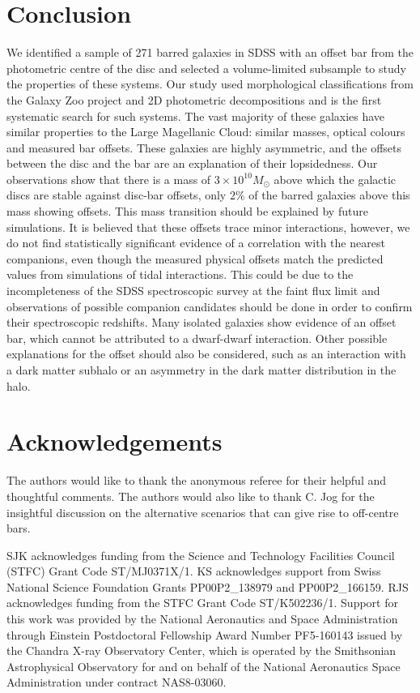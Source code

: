 \documentclass[a4paper,fleqn,usenatbib,useAMS]{mnras}
\begin{document}
\section{Conclusion}

We identified a sample of 271 barred galaxies in SDSS with an offset bar from the photometric centre of the disc and selected a volume-limited subsample to study the properties of these systems. Our study used morphological classifications from the Galaxy Zoo project and 2D photometric decompositions and is the first systematic search for such systems. The vast majority of these galaxies have similar properties to the Large Magellanic Cloud: similar masses, optical colours and measured bar offsets. These galaxies are highly asymmetric, and the offsets between the disc and the bar are an explanation of their lopsidedness. Our observations show that there is a mass of $3 \times10^{10} M_{\odot}$ above which the galactic discs are stable against disc-bar offsets, only $2\%$ of the barred galaxies above this mass showing offsets. This mass transition should be explained by future simulations. It is believed that these offsets trace minor interactions, however, we do not find statistically significant evidence of a correlation with the nearest companions, even though the measured physical offsets match the predicted values from simulations of tidal interactions. This could be due to the incompleteness of the SDSS spectroscopic survey at the faint flux limit and observations of possible companion candidates should be done in order to confirm their spectroscopic redshifts. Many isolated galaxies show evidence of an offset bar, which cannot be attributed to a dwarf-dwarf interaction. Other possible explanations for the offset should also be considered, such as an interaction with a dark matter subhalo or an asymmetry in the dark matter distribution in the halo.



\section*{Acknowledgements}
The authors would like to thank the anonymous referee for their helpful and thoughtful comments. The authors would also like to thank C. Jog for the insightful discussion on the alternative scenarios that can give rise to off-centre bars.

SJK acknowledges funding from the Science and Technology Facilities Council (STFC) Grant Code ST/MJ0371X/1. KS acknowledges support from Swiss National Science Foundation Grants PP00P2\_138979 and PP00P2\_166159. RJS acknowledges funding from the STFC Grant Code ST/K502236/1. Support for this work was provided by the National Aeronautics and Space Administration through Einstein Postdoctoral Fellowship Award Number PF5-160143 issued by the Chandra X-ray Observatory Center, which is operated by the Smithsonian Astrophysical Observatory for and on behalf of the National Aeronautics Space Administration under contract NAS8-03060. 
\end{document}
